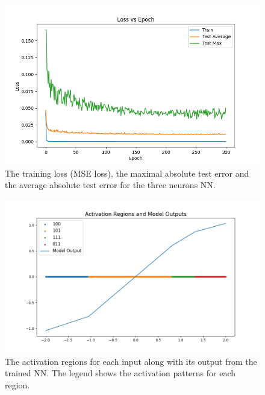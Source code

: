 \documentclass[
	12pt, %
]{../Template/fphw}
\begin{document}
\begin{figure}[!htbp]
    \centering
    \includegraphics[width=\linewidth]{HW1/q2a.png}
    \caption{The training loss (MSE loss), the maximal absolute test error and the average absolute test error for the three neurons NN.}
    \label{fig: q2a}
\end{figure}

\begin{figure}[!htbp]
    \centering
    \includegraphics[width=\linewidth]{HW1/q2b.png}
    \caption{The activation regions for each input along with its output from the trained NN. The legend shows the activation patterns for each region.}
    \label{fig: q2b}
\end{figure}
\end{document}

